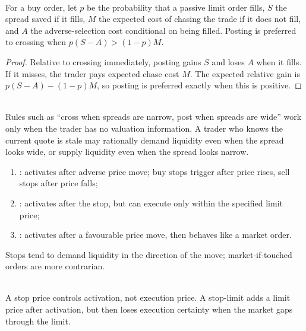\begin{proposition} \\
For a buy order, let $p$ be the probability that a passive limit order fills, $S$ the spread saved if it fills, $M$ the expected cost of chasing the trade if it does not fill, and $A$ the adverse-selection cost conditional on being filled. Posting is preferred to crossing when $p(S-A)>(1-p)M$.
\begin{proof}
Relative to crossing immediately, posting gains $S$ and loses $A$ when it fills.\\
If it misses, the trader pays expected chase cost $M$. The expected relative gain is $p(S-A)-(1-p)M$, so posting is preferred exactly when this is positive.
\end{proof}
\end{proposition}

\begin{caveat} \\
Rules such as ``cross when spreads are narrow, post when spreads are wide'' work only when the trader has no valuation information. A trader who knows the current quote is stale may rationally demand liquidity even when the spread looks wide, or supply liquidity even when the spread looks narrow.
\end{caveat}

\begin{taxonomy} 
\begin{enumerate}[label=\roman*.]
\setlength{\itemsep}{0pt}
\item {}: activates after adverse price move; buy stops trigger after price rises, sell stops after price falls;
\item {}: activates after the stop, but can execute only within the specified limit price;
\item {}: activates after a favourable price move, then behaves like a market order.
\end{enumerate}
Stops tend to demand liquidity in the direction of the move; market-if-touched orders are more contrarian.
\end{taxonomy}

\begin{caveat} \\
A stop price controls activation, not execution price. A stop-limit adds a limit price after activation, but then loses execution certainty when the market gaps through the limit.
\end{caveat}

